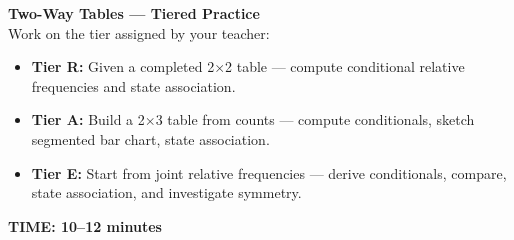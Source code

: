 \documentclass[aspectratio=169, 11pt]{beamer}
\begin{document}
{
\begin{frame}[t, plain]
  \vspace{1.05cm}\par
  \hspace{0.55cm}%
  \begin{minipage}{0.9\textwidth}
    \vspace{1em}
    \small
    \textbf{Two-Way Tables --- Tiered Practice}\\[6pt]
    Work on the tier assigned by your teacher:
    \begin{itemize}
      \setlength{\itemsep}{0.4em}\setlength{\topsep}{0em}
      \item \textbf{Tier R:} Given a completed 2$\times$2 table --- compute conditional relative frequencies and state association.
      \item \textbf{Tier A:} Build a 2$\times$3 table from counts --- compute conditionals, sketch segmented bar chart, state association.
      \item \textbf{Tier E:} Start from joint relative frequencies --- derive conditionals, compare, state association, and investigate symmetry.
    \end{itemize}
    \vspace{0.5cm}
    {\color{redacc}\bfseries\small TIME: 10--12 minutes}
  \end{minipage}
\end{frame}
}
\end{document}

